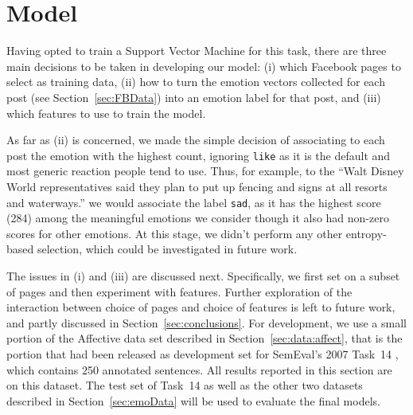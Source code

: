 \documentclass[11pt]{article}
\begin{document}




\section{Model}
\label{sec:model}


Having opted to train a Support Vector Machine for this task, there are three main decisions to be taken in developing our model: (i) which Facebook pages to select as training data, (ii) how to turn the emotion vectors collected for each post (see Section~\ref{sec:FBData}) into an emotion label for that post, and (iii) which features to use to train the model. 

As far as (ii) is concerned, we made the simple decision of associating to each post the emotion with the highest count, ignoring \texttt{like} as it is the default and most generic reaction people tend to use. Thus, for example, to the ``Walt Disney World representatives said 
  they plan to put up fencing and signs at all resorts 
  and waterways.'' 
  we would associate the label \texttt{sad}, as it has the highest score (284) among the meaningful emotions we consider though it also had non-zero scores for other emotions. At this stage, we didn't perform any other entropy-based selection, which could be investigated in future work.
  
  The issues in (i) and (iii) are discussed next. Specifically, we first set on a subset of pages and then experiment with features. Further exploration of the interaction between choice of pages and choice of features is left to future work, and partly discussed in Section~\ref{sec:conclusions}. For development, we use a small portion of the Affective data set described in Section~\ref{sec:data:affect}, that is the portion that had been released as development set for SemEval's 2007 Task~14 \cite{strapparava2007semeval}, which contains 250 annotated sentences. All results reported in this section are on this dataset.
  The test set of Task~14 as well as the other two datasets described in Section~\ref{sec:emoData} will be used to evaluate the final models.
\end{document}
